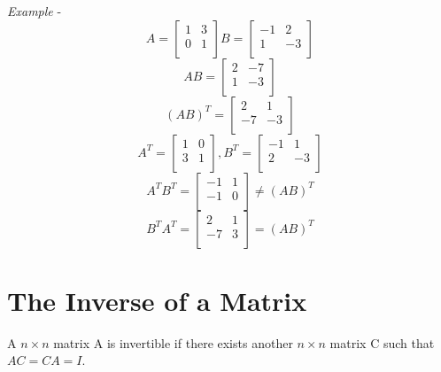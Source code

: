 \documentclass{article}
\begin{document}
\emph{Example} -
\[ A=\left[ \begin{array}{cc}
               1 & 3 \\
               0 & 1 \\
            \end{array}\right]
   B=\left[ \begin{array}{cc}
               -1 & 2 \\
               1 & -3 \\
            \end{array}\right]
\]
\[ AB=\left[ \begin{array}{cc}
                2 & -7 \\
                1 & -3 \\
             \end{array} \right]
\]
\[ (AB)^T=\left[ \begin{array}{cc}
                2 & 1 \\
                -7 & -3 \\
             \end{array} \right]
\]
\[ A^T=\left[ \begin{array}{cc}
                1 & 0 \\
                3 & 1 \\
             \end{array} \right],
   B^T=\left[ \begin{array}{cc}
                -1 & 1 \\
                2 & -3 \\
             \end{array} \right]
\]
\[ A^TB^T=\left[ \begin{array}{cc}
                -1 & 1 \\
                -1 & 0 \\
             \end{array} \right]
             \not=(AB)^T
\]
\[ B^TA^T=\left[ \begin{array}{cc}
                2 & 1 \\
                -7 & 3 \\
             \end{array} \right]
             =(AB)^T
\]

\section{The Inverse of a Matrix}
A $n{\times}n$ matrix A is invertible if there exists another
$n{\times}n$ matrix C such that $AC=CA=I$.
\end{document}
